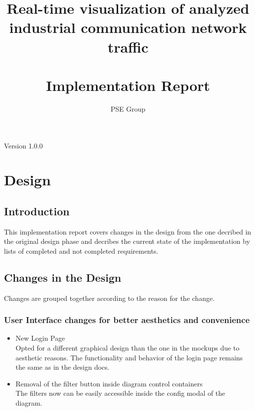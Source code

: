 \documentclass[oneside, english, final]{design}
\author{PSE Group}
\title{Real-time visualization of analyzed industrial communication network traffic\\ \hfill \\Implementation Report}
\begin{document}
\nocite{*}

\setpdf

\maketitle


\hfill

\begin{center}
  \large{Version 1.0.0}
\end{center}


\thispagestyle{empty}
\begin{abstract}
  \thispagestyle{empty}
\end{abstract}

\thispagestyle{empty}
\newpage
\thispagestyle{empty}
\tableofcontents
\cleardoublepage
\setcounter{page}{1}


\section{Design}\label{sec:intro}
\subsection{Introduction}

This implementation report covers changes in the design from the one decribed in the original design phase
and decribes the current state of the implementation by lists of completed and not completed requirements.


\subsection{Changes in the Design}

Changes are grouped together according to the reason for the change.

\subsubsection{User Interface changes for better aesthetics and convenience}
\begin{itemize}
  \item{New Login Page
        \\
        Opted for a different graphical design than the one in the mockups due to aesthetic reasons. The functionality and behavior of the login page remains the same as in the design docs.}

  \item{Removal of the filter button inside diagram control containers
        \\
        The filters now can be easily accessible inside the config modal of the diagram.}
\end{itemize}
\end{document}
